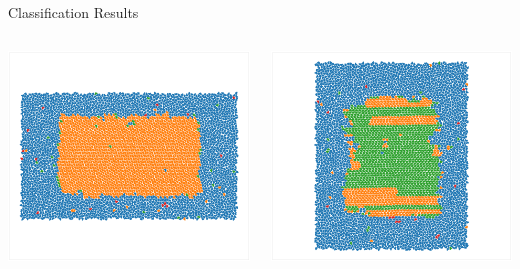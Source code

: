 \documentclass[aspectratio=169, 14pt]{beamer}
\begin{document}
\begin{frame}{Classification Results}
  \begin{columns}
    \begin{column}{0.33\textwidth}
      \includegraphics[width=\textwidth]{classification_results_p2.png}
    \end{column}
    \begin{column}{0.33\textwidth}
      \includegraphics[width=\textwidth]{classification_results_p2gg.png}

\end{column}
\end{columns}
\end{frame}
\end{document}
